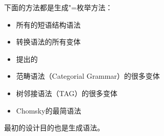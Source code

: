 下面的方法都是生成"=枚举方法：
\begin{itemize}
\item 所有的短语结构语法
\item 转换语法的所有变体
\item  \citet*{GKPS85a}提出的\gpsgc 
\item 范畴语法\indexcgc（Categorial Grammar）的很多变体
\item 树邻接语法\indextagc（TAG）的很多变体
\item Chomsky的最简语法
\end{itemize}
\lfg 最初的设计目的也是生成语法。

